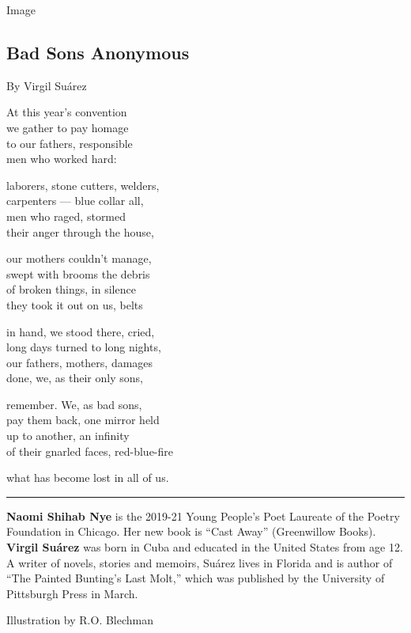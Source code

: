 Image

\hypertarget{bad-sons-anonymous}{%
\subsection{Bad Sons Anonymous}\label{bad-sons-anonymous}}

By Virgil Suárez

At this year's convention\\
we gather to pay homage\\
to our fathers, responsible\\
men who worked hard:

laborers, stone cutters, welders,\\
carpenters --- blue collar all,\\
men who raged, stormed\\
their anger through the house,

our mothers couldn't manage,\\
swept with brooms the debris\\
of broken things, in silence\\
they took it out on us, belts

in hand, we stood there, cried,\\
long days turned to long nights,\\
our fathers, mothers, damages\\
done, we, as their only sons,

remember. We, as bad sons,\\
pay them back, one mirror held\\
up to another, an infinity\\
of their gnarled faces, red-blue-fire

what has become lost in all of us.

\begin{center}\rule{0.5\linewidth}{\linethickness}\end{center}

\textbf{Naomi Shihab Nye} is the 2019-21 Young People's Poet Laureate of
the Poetry Foundation in Chicago. Her new book is ``Cast Away''
(Greenwillow Books). \textbf{Virgil Suárez} was born in Cuba and
educated in the United States from age 12. A writer of novels, stories
and memoirs, Suárez lives in Florida and is author of ``The Painted
Bunting's Last Molt,'' which was published by the University of
Pittsburgh Press in March.

Illustration by R.O. Blechman

